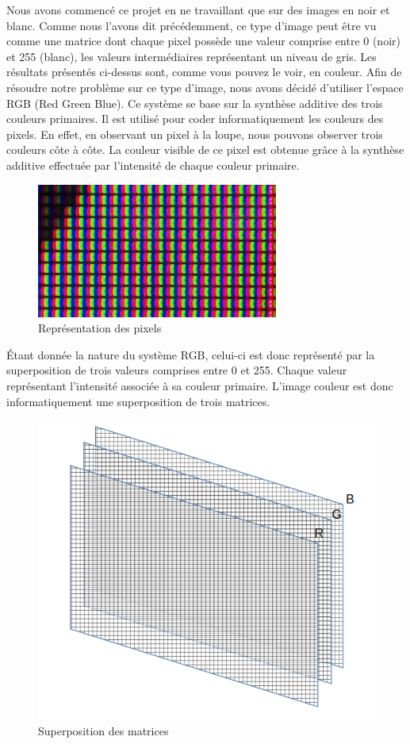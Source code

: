 Nous avons commencé ce projet en ne travaillant que sur des images en noir et blanc. Comme nous l'avons dit précédemment, ce type d'image peut être vu comme une matrice dont chaque pixel possède une valeur comprise entre 0 (noir) et 255 (blanc), les valeurs intermédiaires représentant un niveau de gris. Les résultats présentés ci-dessus sont, comme vous pouvez le voir, en couleur. Afin de résoudre notre problème sur ce type d'image, nous avons décidé d'utiliser l'espace RGB (Red Green Blue). Ce système se base sur la synthèse additive des trois couleurs primaires. Il est utilisé pour coder informatiquement les couleurs des pixels. En effet, en observant un pixel à la loupe, nous pouvons observer trois couleurs côte à côte. La couleur visible de ce pixel est obtenue grâce à la synthèse additive effectuée par l'intensité de chaque couleur primaire. 
 
\begin{figure}[H]
 \centering
\includegraphics[scale=0.5]{Images/pixel.jpg}
 \caption{Représentation des pixels}
  \end{figure}
 
Étant donnée la nature du système RGB, celui-ci est donc représenté par la superposition de trois valeurs comprises entre 0 et 255. Chaque valeur représentant l'intensité associée à sa couleur primaire. L'image couleur est donc informatiquement une superposition de trois matrices.
 \begin{figure}[H]
 \centering
 \includegraphics[scale=0.2]{Images/rgb.png}
 \caption{Superposition des matrices}
 \end{figure}
 
